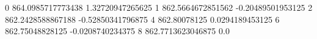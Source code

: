0 864.0985717773438 1.32720947265625
1 862.5664672851562 -0.20489501953125
2 862.2428588867188 -0.52850341796875
4 862.80078125 0.0294189453125
6 862.75048828125 -0.0208740234375
8 862.7713623046875 0.0
